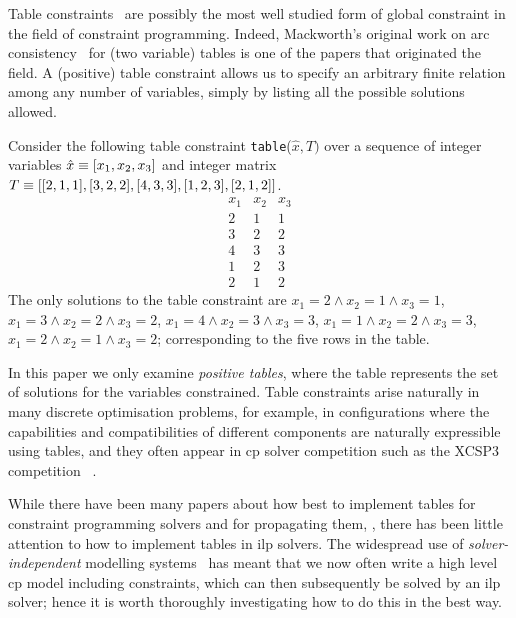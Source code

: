 \documentclass[a4paper,UKenglish,cleveref,autoref,thm-restate]{lipics-v2021}
\newcommand{\milp}{\gls{ilp}\xspace}
\begin{document}
Table constraints~\cite{GAC,STR2,rolandtable} are possibly the most well studied form of global constraint in the field of constraint programming. 
Indeed, Mackworth's original work on arc consistency~\cite{MACKWORTH197799} for (two variable) tables is 
one of the papers that originated the field.
A (positive) table constraint allows us to specify an arbitrary finite relation among any number of variables, simply by listing all the possible solutions allowed. 

\begin{example}\label{ex:running}
Consider the following table constraint \texttt{table}($\hat{x}, T)$ over a sequence of integer variables $\hat{x} \equiv [x_1, x_2, x_3]$ and integer matrix $T \equiv [
[2,1,1],
[3,2,2],
[4,3,3],
[1,2,3],
[2,1,2]
]$.
\begin{equation*}
\begin{array}{rrr}
x_1 & x_2 & x_3 \\ \hline
2 & 1 & 1 \\
3 & 2 & 2 \\
4 & 3 & 3 \\
1 & 2 & 3 \\
2 & 1 & 2 
\end{array}
\end{equation*}
The only solutions to the table constraint are
$x_1 = 2 \wedge x_2 = 1 \wedge x_3 = 1$,
$x_1 = 3 \wedge x_2 = 2 \wedge x_3 = 2$,
$x_1 = 4 \wedge x_2 = 3 \wedge x_3 = 3$,
$x_1 = 1 \wedge x_2 = 2 \wedge x_3 = 3$,
$x_1 = 2 \wedge x_2 = 1 \wedge x_3 = 2$; corresponding to the five rows in the table.
\end{example}
In this paper we only examine \emph{positive tables}, where the table represents the set of solutions for the variables constrained.
Table constraints arise naturally in many discrete optimisation problems, for example, in configurations where the capabilities and compatibilities of different components are naturally expressible using tables, and they often appear in \gls{cp} solver competition such as the XCSP3 competition ~\cite{audemard2025proceedings2025xcsp3competition}.

While there have been many papers about how best to implement tables for constraint programming solvers and for propagating them, \eg \cite{GAC,STR2}, there has been little attention to how to implement tables in \milp solvers.
The widespread use of \emph{solver-independent} modelling systems~\cite{minizinc,guns2019increasing} has meant that we now often write a high level \gls{cp} model including \ttable constraints, which can then subsequently be solved by an \milp solver; hence it is worth thoroughly investigating how to do this in the best way.
\end{document}
